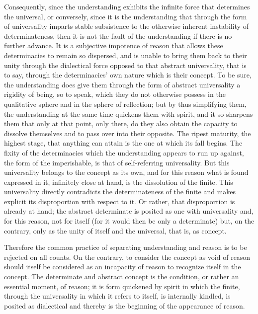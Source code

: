 Consequently, since the understanding exhibits
the infinite force that determines the universal,
or conversely, since it is the understanding
that through the form of universality
imparts stable subsistence to the otherwise
inherent instability of determinateness,
then it is not the fault of the understanding
if there is no further advance.
It is a subjective impotence of reason
that allows these determinacies to remain so dispersed,
and is unable to bring them back to their unity
through the dialectical force opposed
to that abstract universality,
that is to say, through the determinacies'
own nature which is their concept.
To be sure, the understanding does give them
through the form of abstract universality a rigidity of being,
so to speak, which they do not otherwise possess
in the qualitative sphere and in the sphere of reflection;
but by thus simplifying them, the understanding
at the same time quickens them with spirit,
and it so sharpens them that only at that point,
only there, do they also obtain the capacity
to dissolve themselves and to pass over into their opposite.
The ripest maturity, the highest stage,
that anything can attain is
the one at which its fall begins.
The fixity of the determinacies
which the understanding appears to run up against,
the form of the imperishable,
is that of self-referring universality.
But this universality belongs to the concept as its own,
and for this reason what is found expressed in it,
infinitely close at hand,
is the dissolution of the finite.
This universality directly contradicts
the determinateness of the finite
and makes explicit its disproportion
with respect to it.
Or rather, that disproportion is already at hand;
the abstract determinate is posited as
one with universality
and, for this reason, not for itself
(for it would then be only a determinate)
but, on the contrary,
only as the unity of itself and the universal,
that is, as concept.

Therefore the common practice
of separating understanding and reason
is to be rejected on all counts.
On the contrary, to consider the concept
as void of reason should itself be
considered as an incapacity of reason
to recognize itself in the concept.
The determinate and abstract concept is the condition,
or rather an essential moment, of reason;
it is form quickened by spirit in which the finite,
through the universality in which it refers to itself,
is internally kindled, is posited as dialectical
and thereby is the beginning of the appearance of reason.

